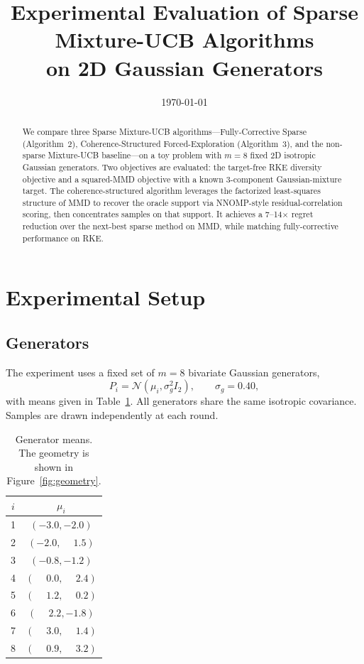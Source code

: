 \documentclass[11pt]{article}
\title{Experimental Evaluation of Sparse Mixture-UCB Algorithms\\
on 2D Gaussian Generators}
\author{}
\date{\today}
\newcommand{\1}{\mathbf{1}}
\begin{document}
\maketitle

\begin{abstract}
We compare three Sparse Mixture-UCB algorithms---Fully-Corrective Sparse (Algorithm~2), Coherence-Structured Forced-Exploration (Algorithm~3), and the non-sparse Mixture-UCB baseline---on a toy problem with $m=8$ fixed 2D isotropic Gaussian generators. Two objectives are evaluated: the target-free RKE diversity objective and a squared-MMD objective with a known 3-component Gaussian-mixture target. The coherence-structured algorithm leverages the factorized least-squares structure of MMD to recover the oracle support via NNOMP-style residual-correlation scoring, then concentrates samples on that support. It achieves a 7--14$\times$ regret reduction over the next-best sparse method on MMD, while matching fully-corrective performance on RKE.
\end{abstract}

\section{Experimental Setup}

\subsection{Generators}
The experiment uses a fixed set of $m=8$ bivariate Gaussian generators,
\[
P_i = \mathcal{N}(\mu_i, \sigma_g^2 I_2), \qquad \sigma_g = 0.40,
\]
with means given in Table~\ref{tab:means}. All generators share the same isotropic covariance. Samples are drawn independently at each round.

\begin{table}[H]
\centering
\begin{tabular}{c|c}
\toprule
$i$ & $\mu_i$ \\
\midrule
1 & $(-3.0, -2.0)$ \\
2 & $(-2.0, \phantom{+}1.5)$ \\
3 & $(-0.8, -1.2)$ \\
4 & $(\phantom{+}0.0, \phantom{+}2.4)$ \\
5 & $(\phantom{+}1.2, \phantom{+}0.2)$ \\
6 & $(\phantom{+}2.2, -1.8)$ \\
7 & $(\phantom{+}3.0, \phantom{+}1.4)$ \\
8 & $(\phantom{+}0.9, \phantom{+}3.2)$ \\
\bottomrule
\end{tabular}
\caption{Generator means. The geometry is shown in Figure~\ref{fig:geometry}.}
\label{tab:means}
\end{table}
\end{document}
